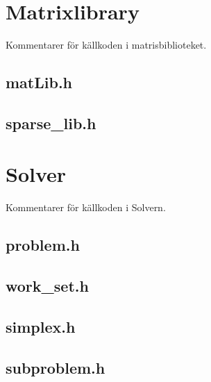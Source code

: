 
\section{Matrixlibrary}
Kommentarer för källkoden i matrisbiblioteket. 

\subsection{matLib.h}


\newpage

\subsection{sparse\_lib.h}


\newpage

\section{Solver}
Kommentarer för källkoden i Solvern.

\subsection{problem.h}


\newpage

\subsection{work\_set.h}


\newpage


\subsection{simplex.h}


\newpage

\subsection{subproblem.h}


